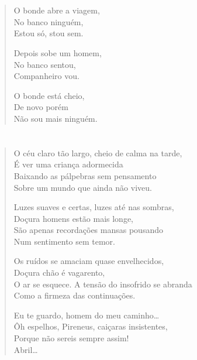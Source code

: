 \chapter*{}

\begin{verse}
O bonde abre a viagem,\\
No banco ninguém,\\
Estou só, stou sem.

Depois sobe um homem,\\
No banco sentou,\\
Companheiro vou.

O bonde está cheio,\\
De novo porém\\
Não sou mais ninguém.
\end{verse}

\chapter*{}

\begin{verse}
O céu claro tão largo, cheio de calma na tarde,\\
É ver uma criança adormecida\\
Baixando as pálpebras sem pensamento\\
Sobre um mundo que ainda não viveu.

Luzes suaves e certas, luzes até nas sombras,\\
Doçura homens estão mais longe,\\
São apenas recordações mansas pousando\\
Num sentimento sem temor.

Os ruídos se amaciam quase envelhecidos,\\
Doçura chão é vagarento,\\
O ar se esquece. A tensão do insofrido se abranda\\
Como a firmeza das continuações.

Eu te guardo, homem do meu caminho\ldots{}\\
Ôh espelhos, Pireneus, caiçaras insistentes,\\
Porque não sereis sempre assim!\\
Abril\ldots{}
\end{verse}

